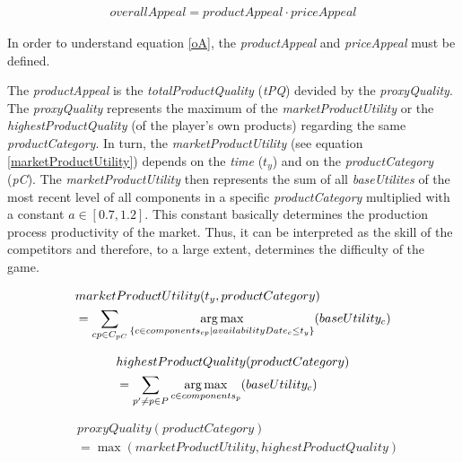 \begin{equation}
\label{oA}
\begin{aligned}
overallAppeal = productAppeal \cdot priceAppeal
\end{aligned}
\end{equation}

In order to understand equation \ref{oA}, the \textit{productAppeal} and \textit{priceAppeal} must be defined.

The \textit{productAppeal} is the \textit{totalProductQuality} (\textit{\gls{tPQ}}) devided by the \textit{proxyQuality}.
The \textit{proxyQuality} represents the maximum of the \textit{marketProductUtility} or the \textit{highestProductQuality} (of the player's own products) regarding the same \textit{productCategory}.
In turn, the \textit{marketProductUtility} (see equation \ref{marketProductUtility}) depends on the \textit{time} ($t_y$) and on the \textit{productCategory} (\textit{\gls{pC}}). The \textit{marketProductUtility} then represents the sum of all \textit{baseUtilites} of the most recent level of all components in a specific \textit{productCategory} multiplied with a constant $a \in [0.7, 1.2]$. 
This constant basically determines the production process productivity of the market. Thus, it can be interpreted as the skill of the competitors and therefore, to a large extent, determines the difficulty of the game.

\begin{equation}
\label{marketProductUtility}
\begin{aligned}
    & marketProductUtility(t_y, productCategory) \\
    & = \sum_{cp \in C_{pC}} \operatorname*{arg\,max}\limits_{\{c \in components_{cp}| availabilityDate_c \leq t_y\}}(baseUtility_c)\\
\end{aligned}    
\end{equation}

\begin{equation}
\label{highestProductQuality}
\begin{aligned}
    & highestProductQuality(productCategory) \\
    & = \sum_{p' \neq p \in P} \operatorname*{arg\,max}\limits_{c \in components_p}(baseUtility_c) \\
\end{aligned}    
\end{equation}

\begin{equation}
\label{proxyQuality}
\begin{aligned}
    & proxyQuality(productCategory) \\
    & = \max(marketProductUtility, highestProductQuality)
\end{aligned}    
\end{equation}

